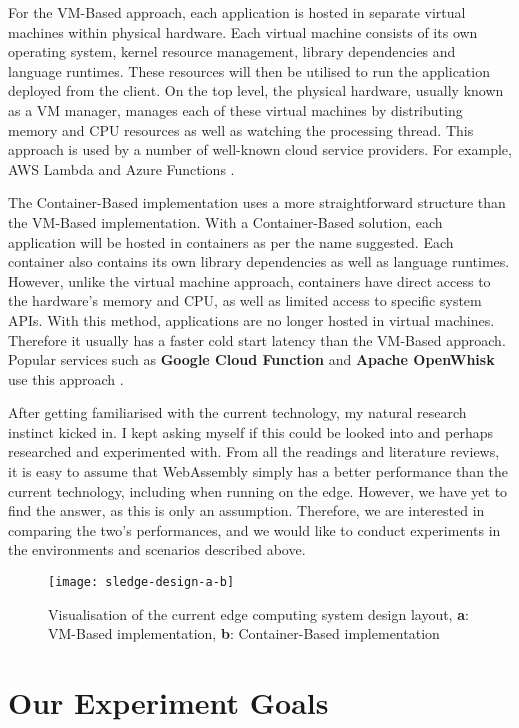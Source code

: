 For the VM-Based approach, each application is hosted in separate virtual machines within physical hardware. Each virtual machine consists of its own operating system, kernel resource management, library dependencies and language runtimes. These resources will then be utilised to run the application deployed from the client. On the top level, the physical hardware, usually known as a VM manager, manages each of these virtual machines by distributing memory and CPU resources as well as watching the processing thread. This approach is used by a number of well-known cloud service providers. For example, AWS Lambda and Azure Functions \cite{exp7} \cite{exp8}.

The Container-Based implementation uses a more straightforward structure than the VM-Based implementation. With a Container-Based solution, each application will be hosted in containers as per the name suggested. Each container also contains its own library dependencies as well as language runtimes. However, unlike the virtual machine approach, containers have direct access to the hardware's memory and CPU, as well as limited access to specific system APIs. With this method, applications are no longer hosted in virtual machines. Therefore it usually has a faster cold start latency than the VM-Based approach. Popular services such as \textbf{Google Cloud Function} and \textbf{Apache OpenWhisk} use this approach \cite{exp9} \cite{exp10}.

After getting familiarised with the current technology, my natural research instinct kicked in. I kept asking myself if this could be looked into and perhaps researched and experimented with. From all the readings and literature reviews, it is easy to assume that WebAssembly simply has a better performance than the current technology, including when running on the edge. However, we have yet to find the answer, as this is only an assumption. Therefore, we are interested in comparing the two's performances, and we would like to conduct experiments in the environments and scenarios described above.

\begin{figure}[hp]
\centering
\texttt{[image: sledge-design-a-b]}
\caption{\footnotesize{Visualisation of the current edge computing system design layout, \textbf{a}: VM-Based implementation, \textbf{b}: Container-Based implementation \cite{exp6}}}
\captionsetup{aboveskip=0pt,font=it}
\end{figure}
\bigskip

\bigskip
\section{Our Experiment Goals}

